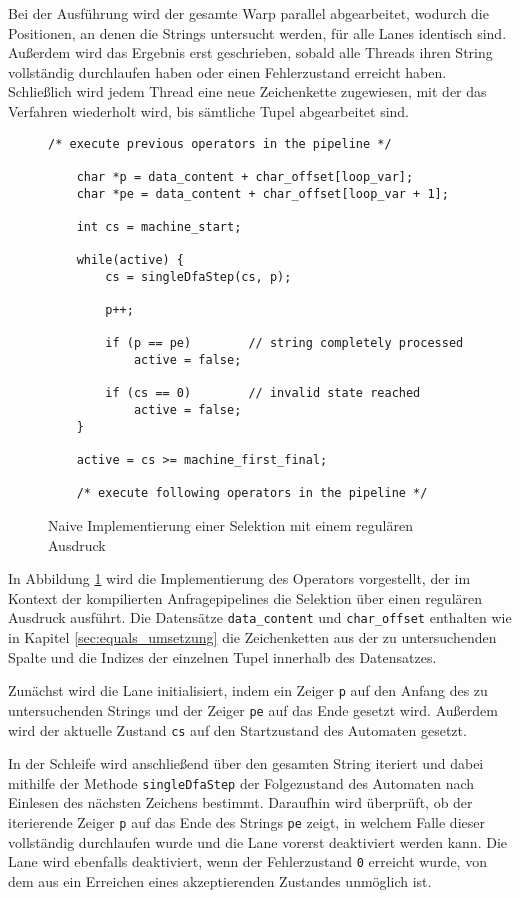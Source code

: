 Bei der Ausführung wird der gesamte Warp parallel abgearbeitet, wodurch die Positionen, an denen die Strings untersucht werden, für alle Lanes identisch sind.
Außerdem wird das Ergebnis erst geschrieben, sobald alle Threads ihren String vollständig durchlaufen haben oder einen Fehlerzustand erreicht haben.
Schließlich wird jedem Thread eine neue Zeichenkette zugewiesen, mit der das Verfahren wiederholt wird, bis sämtliche Tupel abgearbeitet sind.

\begin{figure}[]
	\begin{lstlisting}[language=MyC++]
	/* execute previous operators in the pipeline */
	
	char *p = data_content + char_offset[loop_var];
	char *pe = data_content + char_offset[loop_var + 1];
	
	int cs = machine_start;
	
	while(active) {
		cs = singleDfaStep(cs, p);
		
		p++;
		
		if (p == pe)		// string completely processed
			active = false;
		
		if (cs == 0)		// invalid state reached
			active = false;
	}
	
	active = cs >= machine_first_final;
	
	/* execute following operators in the pipeline */
	\end{lstlisting}
	\caption{Naive Implementierung einer Selektion mit einem regulären Ausdruck}
	\label{naive_regex}
\end{figure}

In Abbildung \ref{naive_regex} wird die Implementierung des Operators vorgestellt, der im Kontext der kompilierten Anfragepipelines die Selektion über einen regulären Ausdruck ausführt.
Die Datensätze \texttt{data\_content} und \texttt{char\_offset} enthalten wie in Kapitel \ref{sec:equals_umsetzung} die Zeichenketten aus der zu untersuchenden Spalte und die Indizes der einzelnen Tupel innerhalb des Datensatzes.

Zunächst wird die Lane initialisiert, indem ein Zeiger \texttt{p} auf den Anfang des zu untersuchenden Strings und der Zeiger \texttt{pe} auf das Ende gesetzt wird.
Außerdem wird der aktuelle Zustand \texttt{cs} auf den Startzustand des Automaten gesetzt.

In der Schleife wird anschließend über den gesamten String iteriert und dabei mithilfe der Methode \texttt{singleDfaStep} der Folgezustand des Automaten nach Einlesen des nächsten Zeichens bestimmt.
Daraufhin wird überprüft, ob der iterierende Zeiger \texttt{p} auf das Ende des Strings \texttt{pe} zeigt, in welchem Falle dieser vollständig durchlaufen wurde und die Lane vorerst deaktiviert werden kann.
Die Lane wird ebenfalls deaktiviert, wenn der Fehlerzustand \texttt{0} erreicht wurde, von dem aus ein Erreichen eines akzeptierenden Zustandes unmöglich ist.

